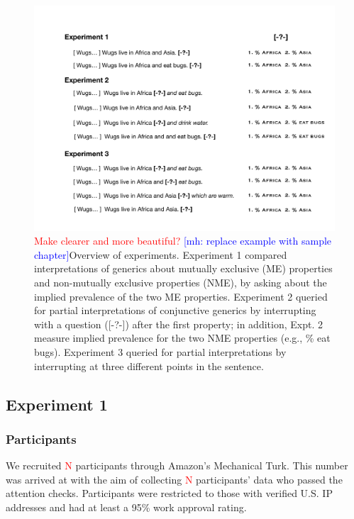 \documentclass[10pt,letterpaper]{article}
\newcommand{\mh}[1]{{\textcolor{Blue}{[mh: #1]}}}
\newcommand{\red}[1]{{\textcolor{Red}{#1}}}
\begin{document}
\begin{figure}[h]
  \centering
    \includegraphics[width=1\textwidth]{design}
  \caption{\red{Make clearer and more beautiful?} \mh{replace example with sample chapter}Overview of experiments. Experiment 1 compared interpretations of generics about mutually exclusive (ME) properties and non-mutually exclusive properties (NME), by asking about the implied prevalence of the two ME properties. Experiment 2 queried for partial interpretations of conjunctive generics by interrupting with a question ([-?-]) after the first property;  in addition, Expt. 2 measure implied prevalence for the two NME properties (e.g., \% eat bugs). Experiment 3 queried for partial interpretations by interrupting at three different points in the sentence. }
  \label{fig:expt1}
\end{figure}
\subsection{Experiment 1}

\subsubsection{Participants}
We recruited \red{N} participants through Amazon's Mechanical Turk.
This number was arrived at with the aim of collecting \red{N} participants' data who passed the attention checks.  
Participants were restricted to those with verified U.S. IP addresses and had at least a 95\% work approval rating. 
\end{document}
